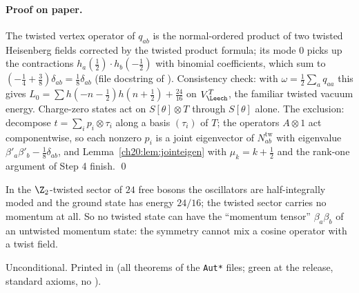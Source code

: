 \paragraph{Proof on paper.}  The twisted vertex operator of $q_{ab}$ is the normal-ordered product of two twisted
Heisenberg fields corrected by the twisted product formula; its mode $0$ picks up the contractions
$h_a(\tfrac12)\cdot h_b(-\tfrac12)$ with binomial coefficients, which sum to $(-\tfrac14+\tfrac38)\delta_{ab}=\tfrac18\delta_{ab}$
(file docstring of ).  Consistency check: with $\omega=\tfrac12\sum_aq_{aa}$ this gives
$L_0=\sum h(-n-\tfrac12)h(n+\tfrac12)+\tfrac{24}{16}$ on $V_\Leech^T$, the familiar twisted vacuum energy.  Charge-zero
states act on $S[\theta]\otimes T$ through $S[\theta]$ alone.  The exclusion: decompose $t=\sum_ip_i\otimes\tau_i$ along a
basis $(\tau_i)$ of $T$; the operators $A\otimes1$ act componentwise, so each nonzero $p_i$ is a joint eigenvector of
$N^{\mathrm{tw}}_{ab}$ with eigenvalue $\beta'_a\beta'_b-\tfrac18\delta_{ab}$, and Lemma~\ref{ch20:lem:jointeigen} with
$\mu_k=k+\tfrac12$ and the rank-one argument of Step 4 finish. \qed
\begin{physics}
In the $\Z_2$-twisted sector of $24$ free bosons the oscillators are half-integrally moded and the ground state has
energy $24/16$; the twisted sector carries no momentum at all.  So no twisted state can have the ``momentum tensor''
$\beta_a\beta_b$ of an untwisted momentum state: the symmetry cannot mix a cosine operator with a twist field.
\end{physics}
\begin{status}
Unconditional.  Printed in  (all theorems of the \texttt{Aut*} files; green at the release, standard axioms, no ).
\end{status}


